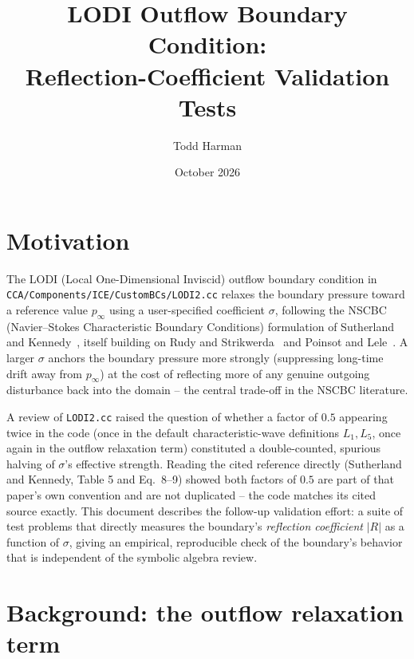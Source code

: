 \documentclass[11pt]{article}
\title{LODI Outflow Boundary Condition: \\
       Reflection-Coefficient Validation Tests}
\author{Todd Harman}
\date{October 2026}
\begin{document}
\maketitle

\section{Motivation}
\label{sec:motivation}

The LODI (Local One-Dimensional Inviscid) outflow boundary condition in
\texttt{CCA/\allowbreak Components/\allowbreak ICE/\allowbreak CustomBCs/\allowbreak LODI2.cc} relaxes the boundary pressure
toward a reference value $p_\infty$ using a user-specified coefficient
$\sigma$, following the NSCBC (Navier--Stokes Characteristic Boundary
Conditions) formulation of Sutherland and Kennedy~\cite{SutherlandKennedy2003},
itself building on Rudy and Strikwerda~\cite{RudyStrikwerda1980} and Poinsot
and Lele~\cite{PoinsotLele1992}. A larger $\sigma$ anchors the boundary
pressure more strongly (suppressing long-time drift away from $p_\infty$) at
the cost of reflecting more of any genuine outgoing disturbance back into the
domain -- the central trade-off in the NSCBC literature.

A review of \texttt{LODI2.cc} raised the question of whether a factor of
$0.5$ appearing twice in the code (once in the default characteristic-wave
definitions $L_1,L_5$, once again in the outflow relaxation term) constituted
a double-counted, spurious halving of $\sigma$'s effective strength. Reading
the cited reference directly (Sutherland and Kennedy, Table 5 and Eq.\
8--9) showed both factors of $0.5$ are part of that paper's own convention
and are not duplicated -- the code matches its cited source exactly. This
document describes the follow-up validation effort: a suite of test problems
that directly measures the boundary's \emph{reflection coefficient} $|R|$ as
a function of $\sigma$, giving an empirical, reproducible check of the
boundary's behavior that is independent of the symbolic algebra review.

\section{Background: the outflow relaxation term}
\label{sec:background}
\end{document}
